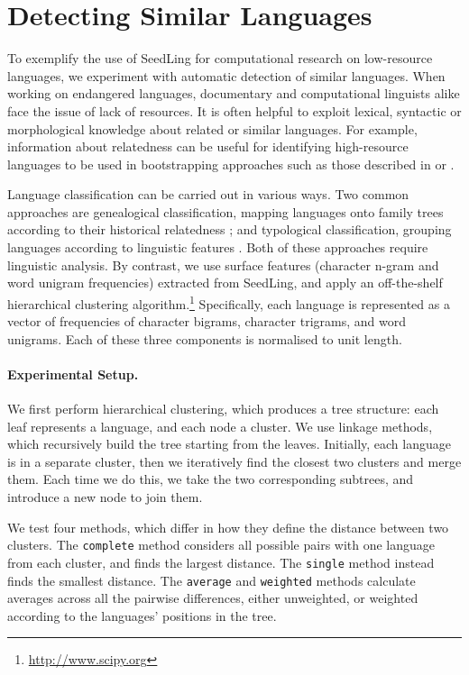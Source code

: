 \section{Detecting Similar Languages} \label{sec:cluster}

To exemplify the use of SeedLing for computational research on low-resource languages, we experiment with automatic detection of similar languages. When working on endangered languages, documentary and computational linguists alike face the issue of lack of resources. It is often helpful to exploit lexical, syntactic or morphological knowledge about related or similar languages. For example, information about relatedness can be useful for identifying high-resource languages to be used in bootstrapping approaches such as those described in  or .

Language classification can be carried out in various ways. Two common approaches are genealogical classification, mapping languages onto family trees according to their historical relatedness \cite{swadesh1952,starostin2010}; and typological classification, grouping languages according to linguistic features \cite{georgi2010wals,daume2009}. Both of these approaches require linguistic analysis. By contrast, we use surface features (character n-gram and word unigram frequencies) extracted from SeedLing, and apply an off-the-shelf hierarchical clustering algorithm.\footnote{\url{http://www.scipy.org}} Specifically, each language is represented as a vector of frequencies of character bigrams, character trigrams, and word unigrams. Each of these three components is normalised to unit length.

\paragraph{Experimental Setup.}
We first perform hierarchical clustering, which produces a tree structure: each leaf represents a language, and each node a cluster. We use linkage methods, which recursively build the tree starting from the leaves. Initially, each language is in a separate cluster, then we iteratively find the closest two clusters and merge them. Each time we do this, we take the two corresponding subtrees, and introduce a new node to join them.

We test four methods, which differ in how they define the distance between two clusters. The \texttt{complete} method considers all possible pairs with one language from each cluster, and finds the largest distance. The \texttt{single} method instead finds the smallest distance. The \texttt{average} and \texttt{weighted} methods calculate averages across all the pairwise differences, either unweighted, or weighted according to the languages' positions in the tree.

